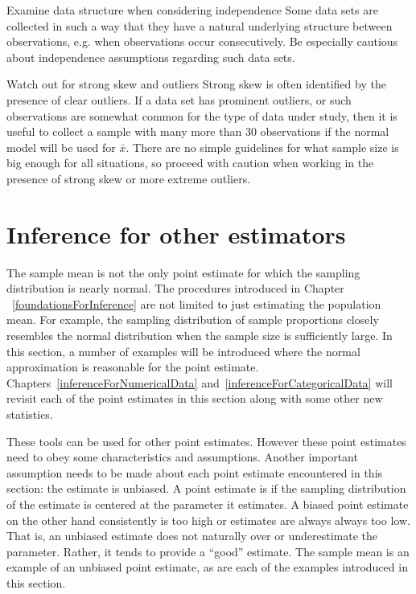 \begin{caution}
{Examine data structure when considering independence}
{Some data sets are collected in such a way that they have a natural underlying structure between observations, e.g. when observations occur consecutively. Be especially cautious about independence assumptions regarding such data sets.}
\end{caution}

\begin{caution}
{Watch out for strong skew and outliers}
{Strong skew is often identified by the presence of clear outliers. If a data set has prominent outliers, or such observations are somewhat common for the type of data under study, then it is useful to collect a sample with many more than 30 observations if the normal model will be used for $\bar{x}$. There are no simple guidelines for what sample size is big enough for all situations, so proceed with caution when working in the presence of strong skew or more extreme outliers.}
\end{caution}


\section{Inference for other estimators}
\label{aFrameworkForInference}

The sample mean is not the only point estimate for which the sampling distribution is nearly normal. The procedures introduced in Chapter ~\ref{foundationsForInference} are not limited to just estimating the population mean. For example, the sampling distribution of sample proportions closely resembles the normal distribution when the sample size is sufficiently large. In this section, a number of examples will be introduced where the normal approximation is reasonable for the point estimate. Chapters~\ref{inferenceForNumericalData} and~\ref{inferenceForCategoricalData} will revisit each of the point estimates in this section along with some other new statistics.

These tools can be used for other point estimates. However these point estimates need to obey some characteristics and assumptions. Another important assumption needs to be made about each point estimate encountered in this section: the estimate is unbiased. A point estimate is  if the sampling distribution of the estimate is centered at the parameter it estimates. A biased point estimate on the other hand consistently is too high or estimates are always always too low. That is, an unbiased estimate does not naturally over or underestimate the parameter. Rather, it tends to provide a ``good'' estimate. The sample mean is an example of an unbiased point estimate, as are each of the examples introduced in this section.

